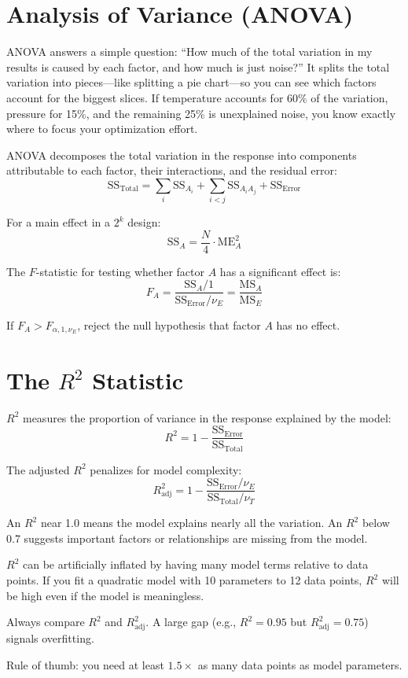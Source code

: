 \documentclass[11pt]{book}
\begin{document}
\section{Analysis of Variance (ANOVA)}

ANOVA answers a simple question: ``How much of the total variation in my results
is caused by each factor, and how much is just noise?'' It splits the total
variation into pieces---like splitting a pie chart---so you can see which factors
account for the biggest slices. If temperature accounts for 60\% of the
variation, pressure for 15\%, and the remaining 25\% is unexplained noise, you
know exactly where to focus your optimization effort.

ANOVA decomposes the total variation in the response into components attributable
to each factor, their interactions, and the residual error:
\[
\text{SS}_{\text{Total}} = \sum_i \text{SS}_{A_i}
+ \sum_{i<j} \text{SS}_{A_iA_j} + \text{SS}_{\text{Error}}
\]

For a main effect in a $2^k$ design:
\[
\text{SS}_A = \frac{N}{4} \cdot \text{ME}_A^2
\]

The $F$-statistic for testing whether factor $A$ has a significant effect is:
\[
F_A = \frac{\text{SS}_A / 1}{\text{SS}_{\text{Error}} / \nu_E}
= \frac{\text{MS}_A}{\text{MS}_E}
\]

If $F_A > F_{\alpha, 1, \nu_E}$, reject the null hypothesis that factor $A$ has
no effect.

\section{The $R^2$ Statistic}

$R^2$ measures the proportion of variance in the response explained by the
model:
\[
R^2 = 1 - \frac{\text{SS}_{\text{Error}}}{\text{SS}_{\text{Total}}}
\]

The adjusted $R^2$ penalizes for model complexity:
\[
R^2_{\text{adj}} = 1 - \frac{\text{SS}_{\text{Error}} / \nu_E}
{\text{SS}_{\text{Total}} / \nu_T}
\]

An $R^2$ near 1.0 means the model explains nearly all the variation. An $R^2$
below 0.7 suggests important factors or relationships are missing from the
model.

\begin{warning}
$R^2$ can be artificially inflated by having many model terms relative to data
points. If you fit a quadratic model with 10 parameters to 12 data points,
$R^2$ will be high even if the model is meaningless.

Always compare $R^2$ and $R^2_{\text{adj}}$. A large gap (e.g., $R^2 = 0.95$
but $R^2_{\text{adj}} = 0.75$) signals overfitting.

Rule of thumb: you need at least $1.5\times$ as many data points as model
parameters.
\end{warning}
\end{document}

